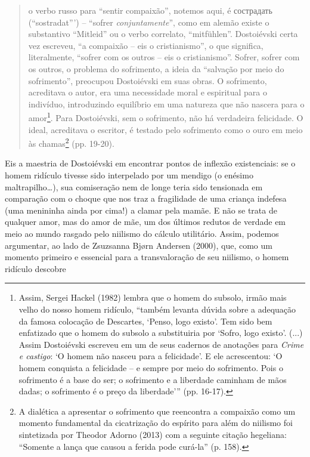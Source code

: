 \begin{quote}
o verbo russo para ``sentir compaixão'', notemos aqui, é
сострадать
(``sostradat''') -- ``sofrer \emph{conjuntamente}'', como em alemão
existe o substantivo ``Mitleid'' ou o verbo correlato, ``mitfühlen''.
Dostoiévski certa vez escreveu, ``a compaixão -- eis o cristianismo'', o
que significa, literalmente, ``sofrer com os outros -- eis o
cristianismo''. Sofrer, sofrer com os outros, o problema do sofrimento,
a ideia da ``salvação por meio do sofrimento'', preocupou Dostoiévski em
suas obras. O sofrimento, acreditava o autor, era uma necessidade moral
e espiritual para o indivíduo, introduzindo equilíbrio em uma natureza
que não nascera para o amor\footnote{Assim, Sergei Hackel (1982) lembra
  que o homem do subsolo, irmão mais velho do nosso homem ridículo,
  ``também levanta dúvida sobre a adequação da famosa colocação de
  Descartes, `Penso, logo existo'. Tem sido bem enfatizado que o homem
  do subsolo a substituiria por `Sofro, logo existo'. (...) Assim
  Dostoiévski escreveu em um de seus cadernos de anotações para
  \emph{Crime e castigo}: `O homem não nasceu para a felicidade'. E ele
  acrescentou: `O homem conquista a felicidade -- e sempre por meio do
  sofrimento. Pois o sofrimento é a base do ser; o sofrimento e a
  liberdade caminham de mãos dadas; o sofrimento é o preço da
  liberdade''' (pp. 16-17).}. Para Dostoiévski, sem o sofrimento, não há
verdadeira felicidade. O ideal, acreditava o escritor, é testado pelo
sofrimento como o ouro em meio às chamas\footnote{A dialética a
  apresentar o sofrimento que reencontra a compaixão como um momento
  fundamental da cicatrização do espírito para além do niilismo foi
  sintetizada por Theodor Adorno (2013) com a seguinte citação
  hegeliana: ``Somente a lança que causou a ferida pode curá-la'' (p.
  158).} (pp. 19-20).
\end{quote}

Eis a maestria de Dostoiévski em encontrar pontos de inflexão
existenciais: se o homem ridículo tivesse sido interpelado por um
mendigo (o enésimo maltrapilho\ldots{}), sua comiseração nem de longe
teria sido tensionada em comparação com o choque que nos traz a
fragilidade de uma criança indefesa (uma menininha ainda por cima!) a
clamar pela mamãe. E não se trata de qualquer amor, mas do amor de mãe,
um dos últimos redutos de verdade em meio ao mundo rasgado pelo niilismo
do cálculo utilitário. Assim, podemos argumentar, ao lado de Zsuzsanna
Bjørn Andersen (2000), que, como um momento primeiro e essencial para a
transvaloração de seu niilismo, o homem ridículo descobre

